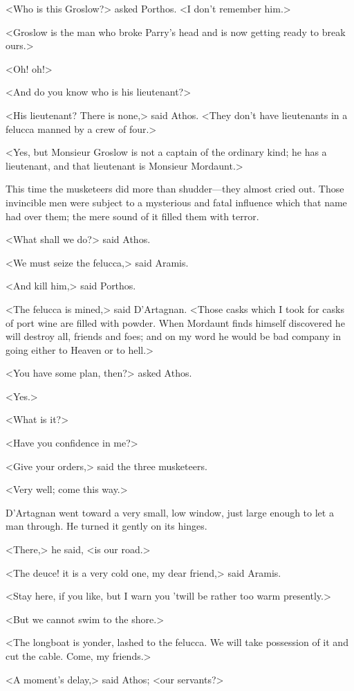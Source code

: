 <Who is this Groslow?> asked Porthos. <I don't remember him.>

<Groslow is the man who broke Parry's head and is now getting ready to break ours.>

<Oh! oh!>

<And do you know who is his lieutenant?>

<His lieutenant? There is none,> said Athos. <They don't have lieutenants in a felucca manned by a crew of four.>

<Yes, but Monsieur Groslow is not a captain of the ordinary kind; he has a lieutenant, and that lieutenant is Monsieur Mordaunt.>

This time the musketeers did more than shudder—they almost cried out. Those invincible men were subject to a mysterious and fatal influence which that name had over them; the mere sound of it filled them with terror.

<What shall we do?> said Athos.

<We must seize the felucca,> said Aramis.

<And kill him,> said Porthos.

<The felucca is mined,> said D'Artagnan. <Those casks which I took for casks of port wine are filled with powder. When Mordaunt finds himself discovered he will destroy all, friends and foes; and on my word he would be bad company in going either to Heaven or to hell.>

<You have some plan, then?> asked Athos.

<Yes.>

<What is it?>

<Have you confidence in me?>

<Give your orders,> said the three musketeers.

<Very well; come this way.>

D'Artagnan went toward a very small, low window, just large enough to let a man through. He turned it gently on its hinges.

<There,> he said, <is our road.>

<The deuce! it is a very cold one, my dear friend,> said Aramis.

<Stay here, if you like, but I warn you 'twill be rather too warm presently.>

<But we cannot swim to the shore.>

<The longboat is yonder, lashed to the felucca. We will take possession of it and cut the cable. Come, my friends.>

<A moment's delay,> said Athos; <our servants?>


